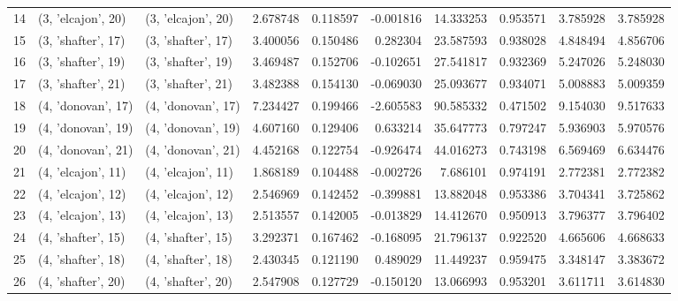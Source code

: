 \begin{tabular}{lllrrrrrrr}
14 &  (3, 'elcajon', 20) &  (3, 'elcajon', 20) &  2.678748 &  0.118597 & -0.001816 &  14.333253 &  0.953571 &  3.785928 &  3.785928 \\
15 &  (3, 'shafter', 17) &  (3, 'shafter', 17) &  3.400056 &  0.150486 &  0.282304 &  23.587593 &  0.938028 &  4.848494 &  4.856706 \\
16 &  (3, 'shafter', 19) &  (3, 'shafter', 19) &  3.469487 &  0.152706 & -0.102651 &  27.541817 &  0.932369 &  5.247026 &  5.248030 \\
17 &  (3, 'shafter', 21) &  (3, 'shafter', 21) &  3.482388 &  0.154130 & -0.069030 &  25.093677 &  0.934071 &  5.008883 &  5.009359 \\
18 &  (4, 'donovan', 17) &  (4, 'donovan', 17) &  7.234427 &  0.199466 & -2.605583 &  90.585332 &  0.471502 &  9.154030 &  9.517633 \\
19 &  (4, 'donovan', 19) &  (4, 'donovan', 19) &  4.607160 &  0.129406 &  0.633214 &  35.647773 &  0.797247 &  5.936903 &  5.970576 \\
20 &  (4, 'donovan', 21) &  (4, 'donovan', 21) &  4.452168 &  0.122754 & -0.926474 &  44.016273 &  0.743198 &  6.569469 &  6.634476 \\
21 &  (4, 'elcajon', 11) &  (4, 'elcajon', 11) &  1.868189 &  0.104488 & -0.002726 &   7.686101 &  0.974191 &  2.772381 &  2.772382 \\
22 &  (4, 'elcajon', 12) &  (4, 'elcajon', 12) &  2.546969 &  0.142452 & -0.399881 &  13.882048 &  0.953386 &  3.704341 &  3.725862 \\
23 &  (4, 'elcajon', 13) &  (4, 'elcajon', 13) &  2.513557 &  0.142005 & -0.013829 &  14.412670 &  0.950913 &  3.796377 &  3.796402 \\
24 &  (4, 'shafter', 15) &  (4, 'shafter', 15) &  3.292371 &  0.167462 & -0.168095 &  21.796137 &  0.922520 &  4.665606 &  4.668633 \\
25 &  (4, 'shafter', 18) &  (4, 'shafter', 18) &  2.430345 &  0.121190 &  0.489029 &  11.449237 &  0.959475 &  3.348147 &  3.383672 \\
26 &  (4, 'shafter', 20) &  (4, 'shafter', 20) &  2.547908 &  0.127729 & -0.150120 &  13.066993 &  0.953201 &  3.611711 &  3.614830 \\
\bottomrule
\end{tabular}
